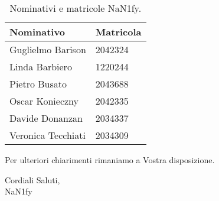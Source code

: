 \begin{table}[ht!]
		\centering
		\begin{tabular}{p{3cm} p{3cm}}
			\toprule
			\textbf{Nominativo} & \textbf{Matricola} \\
			\midrule
			Guglielmo Barison & 2042324 \\
			Linda Barbiero &  1220244 \\
			Pietro Busato & 2043688 \\
			Oscar Konieczny & 2042335 \\
			Davide Donanzan & 2034337 \\
			Veronica Tecchiati & 2034309 \\
			\bottomrule
		\end{tabular}
		\caption{Nominativi e matricole NaN1fy.}
		\label{table:Nominativi e matricole NaN1fy}
\end{table}
Per ulteriori chiarimenti rimaniamo a Vostra disposizione.
\vspace{1em}
\begin{flushleft}
	Cordiali Saluti,\\
	NaN1fy
\end{flushleft}